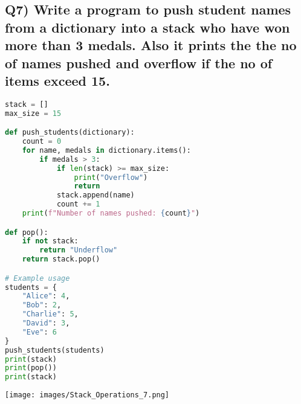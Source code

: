 \documentclass{article}
\begin{document}
\subsection*{Q7) Write a program to push student names from a dictionary into a stack who have won more than 3 medals. Also it prints the the no of names pushed and overflow if the no of items exceed 15.}
\begin{lstlisting}[language=Python]
stack = []
max_size = 15

def push_students(dictionary):
    count = 0
    for name, medals in dictionary.items():
        if medals > 3:
            if len(stack) >= max_size:
                print("Overflow")
                return
            stack.append(name)
            count += 1
    print(f"Number of names pushed: {count}")

def pop():
    if not stack:
        return "Underflow"
    return stack.pop()

# Example usage
students = {
    "Alice": 4,
    "Bob": 2,
    "Charlie": 5,
    "David": 3,
    "Eve": 6
}
push_students(students)
print(stack)
print(pop())
print(stack)
\end{lstlisting}
\texttt{[image: images/Stack\_Operations\_7.png]}
\end{document}
